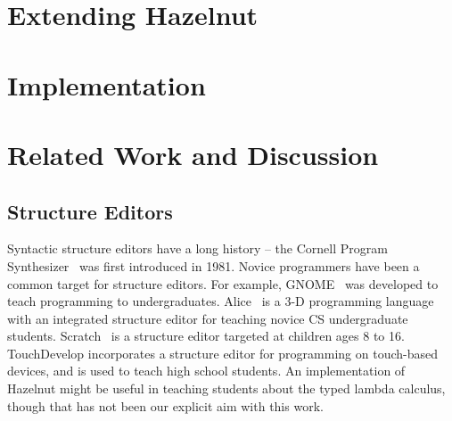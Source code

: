 \documentclass[preprint,9pt]{sigplanconf}
\begin{document}


% 


\section{Extending Hazelnut}\label{sec:extending}


\section{Implementation}
\label{sec:impl}


\section{Related Work and Discussion}\label{sec:rw}
\subsection{Structure Editors}
Syntactic structure editors have a long history -- the Cornell Program Synthesizer~\cite{teitelbaum_cornell_1981} was first introduced in 1981. Novice programmers have been a common target for structure editors. For example,
GNOME~\cite{garlan_gnome:_1984} was developed to teach programming to undergraduates.
Alice~\cite{Conway:2000:ALL:332040.332481} is a 3-D programming language with an integrated structure editor for teaching novice CS undergraduate students. Scratch~\cite{Resnick:2009:SP:1592761.1592779} is a structure editor targeted at children ages 8 to 16.  TouchDevelop \cite{tillmann_touchdevelop:_2011} incorporates a structure editor for programming on touch-based devices, and is used to teach high school students. An implementation of Hazelnut might be useful in teaching students about the typed lambda calculus, though that has not been our explicit aim with this work.
\end{document}

